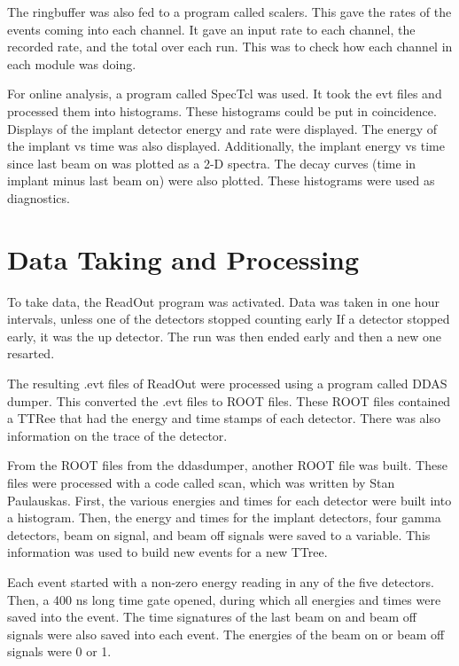 The ringbuffer was also fed to a program called scalers.
This gave the rates of the events coming into each channel.
It gave an input rate to each channel, the recorded rate, and the total over each run.
This was to check how each channel in each module was doing.

For online analysis, a program called SpecTcl was used.
It took the evt files and processed them into histograms.
These histograms could be put in coincidence.
Displays of the implant detector energy and rate were displayed.
The energy of the implant vs time was also displayed.
Additionally, the implant energy vs time since last beam on was plotted as a 2-D spectra.
The decay curves (time in implant minus last beam on) were also plotted.
These histograms were used as diagnostics. 

\section{Data Taking and Processing}
To take data, the ReadOut program was activated. 
Data was taken in one hour intervals, unless one of the detectors stopped counting early
If a detector stopped early, it was the up detector.
The run was then ended early and then a new one resarted.

The resulting .evt files of ReadOut were processed using a program called DDAS dumper.
This converted the .evt files to ROOT files.
These ROOT files contained a TTRee that had the energy and time stamps of each detector.
There was also information on the trace of the detector.

From the ROOT files from the ddasdumper, another ROOT file was built.
These files were processed with a code called scan, which was written by Stan Paulauskas.
First, the various energies and times for each detector were built into a histogram.
Then, the energy and times for the implant detectors, four gamma detectors, beam on signal, and beam off signals were saved to a variable.
This information was used to build new events for a new TTree.

Each event started with a non-zero energy reading in any of the five detectors.
Then, a 400 ns long time gate opened, during which all energies and times were saved into the event.
The time signatures of the last beam on and beam off signals were also saved into each event.
The energies of the beam on or beam off signals were 0 or 1.
